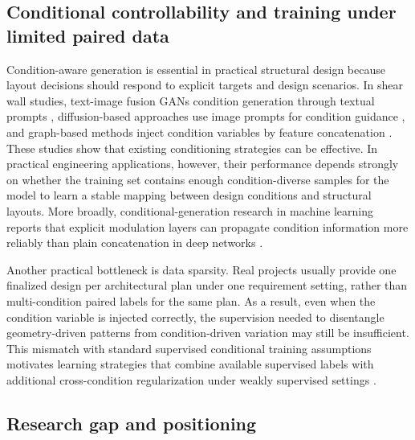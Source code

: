 \subsection{Conditional controllability and training under limited paired data}
\label{subsec:conditional_data_scarcity}

Condition-aware generation is essential in practical structural design because layout decisions should respond to explicit targets and design scenarios. In shear wall studies, text-image fusion GANs condition generation through textual prompts \cite{liaoIntelligentGenerativeStructural2022a}, diffusion-based approaches use image prompts for condition guidance \cite{zhouStructDiffusionEndendIntelligent2024}, and graph-based methods inject condition variables by feature concatenation \cite{zhaoDesignconditioninformedShearWall2023d}. These studies show that existing conditioning strategies can be effective. In practical engineering applications, however, their performance depends strongly on whether the training set contains enough condition-diverse samples for the model to learn a stable mapping between design conditions and structural layouts. More broadly, conditional-generation research in machine learning reports that explicit modulation layers can propagate condition information more reliably than plain concatenation in deep networks \cite{perezFiLMVisualReasoning2018,huangUnifiedConditionalDiffusion2024}.

Another practical bottleneck is data sparsity. Real projects usually provide one finalized design per architectural plan under one requirement setting, rather than multi-condition paired labels for the same plan. As a result, even when the condition variable is injected correctly, the supervision needed to disentangle geometry-driven patterns from condition-driven variation may still be insufficient. This mismatch with standard supervised conditional training assumptions motivates learning strategies that combine available supervised labels with additional cross-condition regularization under weakly supervised settings \cite{dasConditionalSyntheticData2022,chenCounterfactualSamplesSynthesizing2023}.

\subsection{Research gap and positioning}
\label{subsec:research_gap}

